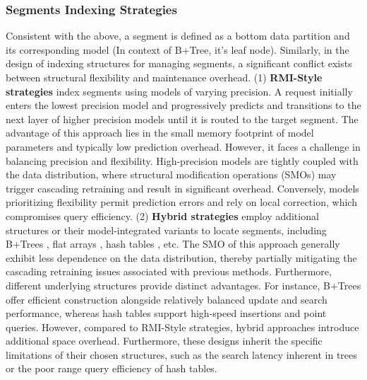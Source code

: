 \subsubsection{Segments Indexing Strategies}
Consistent with the above, a segment is defined as a bottom data partition and its corresponding model (In context of B+Tree, it's leaf node). Similarly, in the design of indexing structures for managing segments, a significant conflict exists between structural flexibility and maintenance overhead. (1) \textbf{RMI-Style strategies} \cite{xindex20, chameleon24, sali23} index segments using models of varying precision. A request initially enters the lowest precision model and progressively predicts and transitions to the next layer of higher precision models until it is routed to the target segment. The advantage of this approach lies in the small memory footprint of model parameters and typically low prediction overhead. However, it faces a challenge in balancing precision and flexibility. High-precision models are tightly coupled with the data distribution, where structural modification operations (SMOs) may trigger cascading retraining and result in significant overhead. Conversely, models prioritizing flexibility permit prediction errors and rely on local correction, which compromises query efficiency. (2) \textbf{Hybrid strategies} employ additional structures or their model-integrated variants to locate segments, including B+Trees \cite{fiting-tree19, learnedkv24}, flat arrays \cite{swix24, uplif25}, hash tables \cite{lits24, lead26}, etc. The SMO of this approach generally exhibit less dependence on the data distribution, thereby partially mitigating the cascading retraining issues associated with previous methods. Furthermore, different underlying structures provide distinct advantages. For instance, B+Trees offer efficient construction alongside relatively balanced update and search performance, whereas hash tables support high-speed insertions and point queries. However, compared to RMI-Style strategies, hybrid approaches introduce additional space overhead. Furthermore, these designs inherit the specific limitations of their chosen structures, such as the search latency inherent in trees or the poor range query efficiency of hash tables.

